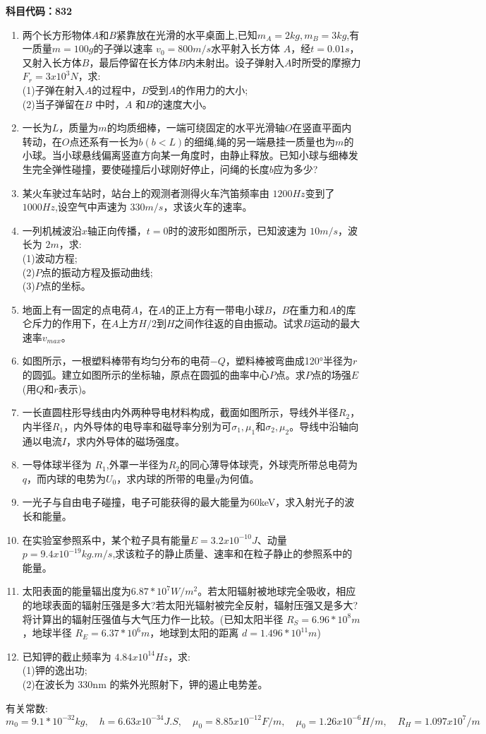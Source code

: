 \textbf{科目代码：832}
\begin{enumerate}
\item 两个长方形物体$A$和$B$紧靠放在光滑的水平桌面上,已知$m_A=2kg,m_B=3kg$,有一质量$ m=100g$的子弹以速率 $v_0=800m/s$水平射入长方体 $A$，经$t=0.01s$，又射入长方体$B$，最后停留在长方体$B$内未射出。设子弹射入$A$时所受的摩擦力$F_r=3x10^3N$，求:\\
(1)子弹在射入$A$的过程中，$B $受到$A$的作用力的大小;\\
(2)当子弹留在$ B$ 中时，$A$ 和$B$的速度大小。
\item 一长为$L$，质量为$m$的均质细棒，一端可绕固定的水平光滑轴$O$在竖直平面内转动，在$O$点还系有一长为$b(b<L)$的细绳,绳的另一端悬挂一质量也为$m$的小球。当小球悬线偏离竖直方向某一角度时，由静止释放。已知小球与细棒发生完全弹性碰撞，要使碰撞后小球刚好停止，问绳的长度$b$应为多少?
\item 某火车驶过车站时，站台上的观测者测得火车汽笛频率由 $1200Hz$变到了 $1000 Hz$,设空气中声速为 $330m/s$，求该火车的速率。
\item 一列机械波沿$x$轴正向传播，$t=0$时的波形如图所示，已知波速为 $10m/s$，波长为 $2m$，求:\\
(1)波动方程;\\
(2)$P$点的振动方程及振动曲线;\\
(3)$P $点的坐标。
\item 地面上有一固定的点电荷$ A$，在$A$的正上方有一带电小球$B$，$B$在重力和$A$的库仑斥力的作用下，在$A$上方$ H/2 $到$H$之间作往返的自由振动。试求$B$运动的最大速率$v_{max}$。
\item  如图所示，一根塑料棒带有均匀分布的电荷$-Q$，塑料棒被弯曲成120°半径为$r$的圆弧。建立如图所示的坐标轴，原点在圆弧的曲率中心$P$点。求$P$点的场强$E$(用$Q$和$r$表示)。
\item 一长直圆柱形导线由内外两种导电材料构成，截面如图所示，导线外半径$R_2$，内半径$R_1$，内外导体的电导率和磁导率分别为可$\sigma_1,\mu_1$和$\sigma_2,\mu_2$。导线中沿轴向通以电流$I$，求内外导体的磁场强度。
\item 一导体球半径为 $R_1$,外罩一半径为$ R_2$的同心薄导体球壳，外球壳所带总电荷为$q$，而内球的电势为$ U_0$，求内球的所带的电量$ q$为何值。
\item 一光子与自由电子碰撞，电子可能获得的最大能量为60keV，求入射光子的波长和能量。
\item 在实验室参照系中，某个粒子具有能量$E=3.2x10^{-10}J$、动量$p=9.4x10^{-19}kg.m/s$,求该粒子的静止质量、速率和在粒子静止的参照系中的能量。
\item 太阳表面的能量辐出度为$6.87*10^7 W/m^2$。若太阳辐射被地球完全吸收，相应的地球表面的辐射压强是多大?若太阳光辐射被完全反射，辐射压强又是多大?将计算出的辐射压强值与大气压力作一比较。(已知太阳半径 $R_S=6.96*10^8m$，地球半径 $R_E=6.37*10^6m$，地球到太阳的距离 $d=1.496*10^{11}m$)
\item 已知钾的截止频率为 $4.84x10^{14}Hz$，求:\\
(1)钾的逸出功;\\
(2)在波长为 330nm 的紫外光照射下，钾的遏止电势差。




\end{enumerate}
有关常数:$m_0=9.1*10^{-32}kg,\quad h=6.63x10^{-34}J.S,\quad \mu_0=8.85x10^{-12}F/m,\quad \mu_0=1.26x10^{-6} H/m,
\quad R_H=1.097x10^7/m$
